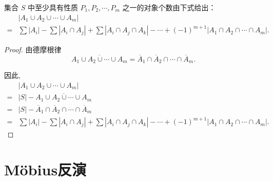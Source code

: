 \begin{theorem}[容斥原理]
    集合 $S$ 中至少具有性质 $P_1, P_2, \cdots, P_m$ 之一的对象个数由下式给出：
\begin{align*}
    &|A_1 \cup A_2 \cup \cdots \cup A_m| \\=&\sum |A_i| - \sum |A_i \cap A_j| + \sum |A_i \cap A_j \cap A_k| - \cdots + (-1)^{m+1} |A_1 \cap A_2 \cap \cdots \cap A_m|.
\end{align*}
\end{theorem}
\begin{proof}
    由德摩根律
    $$\overline{A_1 \cup A_2 \cup \cdots \cup A_m} = \overline{A}_1 \cap \overline{A}_2 \cap \cdots \cap \overline{A}_m.$$

    因此,
    \begin{align*}
        &|A_1 \cup A_2 \cup \cdots \cup A_m|\\=&|S|-\overline{A_1 \cup A_2 \cup \cdots \cup A_m}\\
        =&|S|-\overline{A}_1 \cap \overline{A}_2 \cap \cdots \cap \overline{A}_m\\
        =&\sum |A_i| - \sum |A_i \cap A_j| + \sum |A_i \cap A_j \cap A_k| - \cdots + (-1)^{m+1} |A_1 \cap A_2 \cap \cdots \cap A_m|.
    \end{align*}
\end{proof}

\section{Möbius反演}

